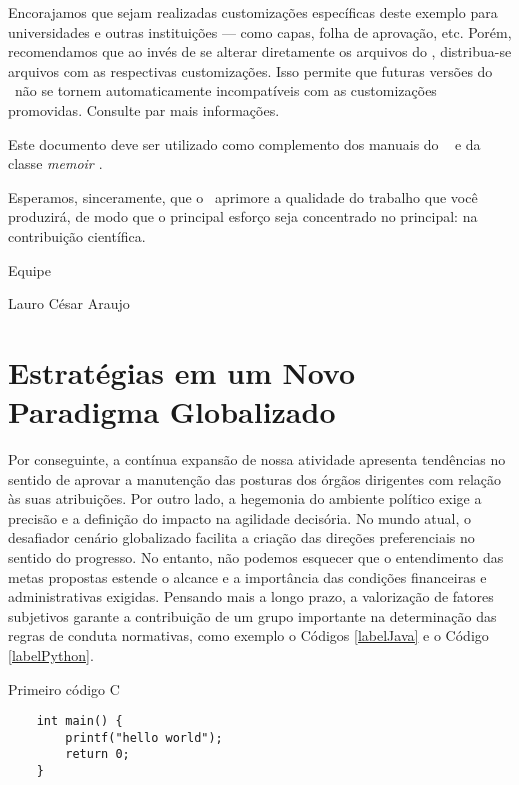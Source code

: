 Encorajamos que sejam realizadas customizações específicas deste exemplo para
universidades e outras instituições --- como capas, folha de aprovação, etc.
Porém, recomendamos que ao invés de se alterar diretamente os arquivos do
\abnTeX, distribua-se arquivos com as respectivas customizações.
Isso permite que futuras versões do \abnTeX~não se tornem automaticamente
incompatíveis com as customizações promovidas. Consulte
 par mais informações.

Este documento deve ser utilizado como complemento dos manuais do \abnTeX\ \cite{abntex2classe,abntex2cite,abntex2cite-alf} e da classe \emph{memoir \cite{memoir}}. 

Esperamos, sinceramente, que o \abnTeX\ aprimore a qualidade do trabalho que
você produzirá, de modo que o principal esforço seja concentrado no principal:
na contribuição científica.

Equipe \abnTeX 

Lauro César Araujo

\section{Estratégias em um Novo Paradigma Globalizado}
Por conseguinte, a contínua expansão de nossa atividade apresenta tendências no sentido de aprovar a manutenção das posturas dos órgãos dirigentes com relação às suas atribuições. Por outro lado, a hegemonia do ambiente político exige a precisão e a definição do impacto na agilidade decisória. No mundo atual, o desafiador cenário globalizado facilita a criação das direções preferenciais no sentido do progresso. No entanto, não podemos esquecer que o entendimento das metas propostas estende o alcance e a importância das condições financeiras e administrativas exigidas. Pensando mais a longo prazo, a valorização de fatores subjetivos garante a contribuição de um grupo importante na determinação das regras de conduta normativas, como exemplo o Códigos \ref{labelJava} e o Código \ref{labelPython}.

\begin{listing}[H]
    \caption{Primeiro código C}
    \label{labelJava}
    
    \begin{verbatim}
    int main() {
        printf("hello world");
        return 0;
    }
    \end{verbatim}
    
\end{listing}

